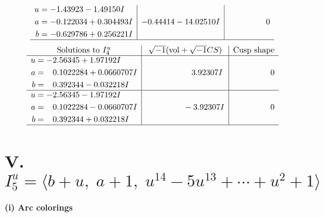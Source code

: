 \documentclass[1p]{elsarticle_modified}
\theoremstyle{definition}
\newcommand{\I}{\sqrt{-1}}
\begin{document}
$$\begin{array}{c|c|c}
\begin{aligned}
u &= -1.43923 - 1.49150 I \\
a &= -0.122034 + 0.304493 I \\
b &= -0.629786 + 0.256221 I\end{aligned}
 & -0.44414 - 14.02510 I & \phantom{-0.000000 } 0\\
 \hline 
 \end{array}$$\newpage$$\begin{array}{c|c|c}  
\text{Solutions to }I^u_{4}& \I (\text{vol} + \sqrt{-1}CS) & \text{Cusp shape}\\
 \hline 
\begin{aligned}
u &= -2.56345 + 1.97192 I \\
a &= \phantom{-}0.1022284 + 0.0660707 I \\
b &= \phantom{-}0.392344 - 0.032218 I\end{aligned}
 & \phantom{-0.000000 -}3.92307 I & \phantom{-0.000000 } 0 \\ \hline\begin{aligned}
u &= -2.56345 - 1.97192 I \\
a &= \phantom{-}0.1022284 - 0.0660707 I \\
b &= \phantom{-}0.392344 + 0.032218 I\end{aligned}
 & \phantom{-0.000000 } -3.92307 I & \phantom{-0.000000 } 0\\
 \hline 
 \end{array}$$\newpage\newpage\renewcommand{\arraystretch}{1}
\centering \section*{V. $I^u_{5}= \langle b+u,\;a+1,\;u^{14}-5 u^{13}+\cdots+u^2+1 \rangle$}
\flushleft \textbf{(i) Arc colorings}\\
\end{document}
